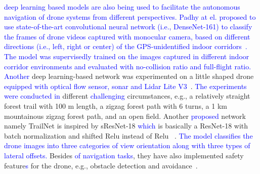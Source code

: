 \textcolor{blue}{deep learning based models are also being used to facilitate the autonomous navigation of drone systems from different perspectives. Padhy at el. proposed to use state-of-the-art convolutional neural network (i.e., DenseNet-161) to classify the frames of drone videos captured with monocular camera, based on different directions (i.e., left, right or center) of the GPS-unidentified indoor corridors~\cite{padhy2018deep}. The model was supervisedly trained on the images captured in different indoor corridor environments and evaluated with no-collision ratio and full-flight ratio.}
\textcolor{blue}{Another} deep learning-based network was experimented on a little shaped drone \textcolor{blue}{equipped with optical flow sensor, sonar and Lidar Lite V3}~\cite{smolyanskiy2017toward}.
\textcolor{blue}{The experiments were conducted in} different \textcolor{blue}{challenging} circumstances, e.g., a  relatively straight forest trail with 100 m length, a  zigzag forest path with 6 turns, a 1 km mountainous zigzag forest path, and an open field. Another \textcolor{blue}{proposed} network namely TrailNet is inspired by sResNet-18 \textcolor{blue}{which} is basically a ResNet-18 with batch normalization and shifted Relu  instead of Relu ~\cite{he2016deep}. %
\textcolor{blue}{The model classifies the drone images into three categories of view orientation along with three types of lateral offsets.} Besides \textcolor{blue}{of navigation tasks}, they have also implemented safety feature\textcolor{blue}{s} for the drone, e.g., obstacle detection and avoidance~\cite{he2016deep}.

